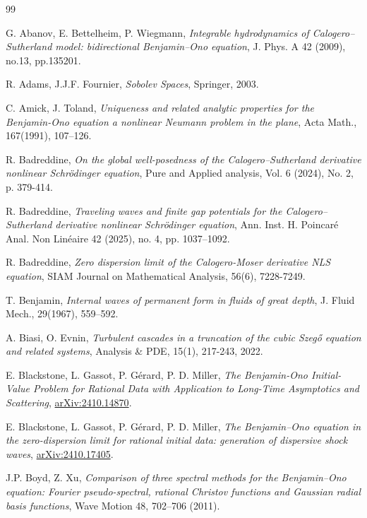 \documentclass [11pt] {article}
\begin{document}
\begin{thebibliography}{99}

 G. Abanov, E. Bettelheim, P. Wiegmann, {\it Integrable hydrodynamics of Calogero--Sutherland model: bidirectional Benjamin--Ono equation}, J. Phys. A 42 (2009), no.13, pp.135201.

 R. Adams, J.J.F. Fournier, {\it Sobolev Spaces}, Springer, 2003.

 C. Amick, J. Toland, {\it Uniqueness and related analytic properties for the Benjamin-Ono equation a nonlinear Neumann problem in the plane}, Acta Math., 167(1991), 107–126.

 R. Badreddine, {\it On the global well-posedness of the Calogero–Sutherland derivative nonlinear Schr\"odinger equation}, Pure and Applied analysis, Vol. 6 (2024), No. 2, p. 379-414.

 R. Badreddine, {\it Traveling waves and finite gap potentials for the Calogero--Sutherland derivative nonlinear Schrödinger equation}, Ann. Inst. H. Poincaré Anal. Non Linéaire 42 (2025), no. 4, pp. 1037–1092.

 R. Badreddine, {\it Zero dispersion limit of the Calogero-Moser derivative NLS equation}, SIAM Journal on Mathematical Analysis, 56(6), 7228-7249.

 T. Benjamin, {\it Internal waves of permanent form in fluids of great depth}, J. Fluid Mech., 29(1967), 559--592.

 A. Biasi, O. Evnin, {\it Turbulent cascades in a truncation of the cubic Szeg\H o equation and related systems}, Analysis \& PDE, 15(1), 217-243, 2022.

 E. Blackstone, L. Gassot, P. G\'erard, P. D. Miller, {\it The Benjamin-Ono Initial-Value Problem for Rational Data with Application to Long-Time Asymptotics and Scattering}, \href{https://arxiv.org/abs/2410.14870}{arXiv:2410.14870}.

 E. Blackstone, L. Gassot, P. G\'erard, P. D. Miller, {\it The Benjamin–Ono equation in the zero-dispersion limit for rational initial data: generation of dispersive shock waves}, \href{https://arxiv.org/abs/2410.17405}{arXiv:2410.17405}.

 J.P. Boyd, Z. Xu, {\it Comparison of three spectral methods for the Benjamin--Ono equation: Fourier pseudo-spectral, rational Christov functions and Gaussian radial basis functions}, Wave Motion 48, 702--706 (2011).


\end{thebibliography}
\end{document}
